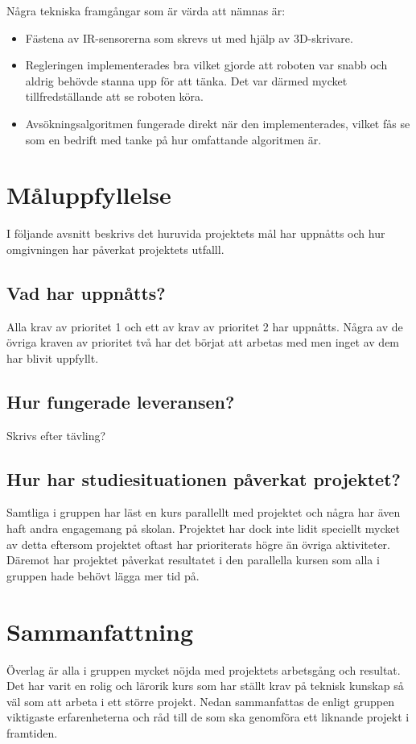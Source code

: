 \documentclass[11pt]{article}
\begin{document}
Några tekniska framgångar som är värda att nämnas är:
\begin{itemize}
\item Fästena av IR-sensorerna som skrevs ut med hjälp av 3D-skrivare.
\item Regleringen implementerades bra vilket gjorde att roboten var snabb och aldrig behövde stanna upp för att tänka. Det var därmed mycket tillfredställande att se roboten köra. 
\item Avsökningsalgoritmen fungerade direkt när den implementerades, vilket fås se som en bedrift med tanke på hur omfattande algoritmen är. 
\end{itemize} 

\pagebreak

\section{Måluppfyllelse}
I följande avsnitt beskrivs det huruvida projektets mål har uppnåtts och hur omgivningen har påverkat projektets utfalll.

\subsection{Vad har uppnåtts?}
Alla krav av prioritet 1 och ett av krav av prioritet 2 har uppnåtts. Några av de övriga kraven av prioritet två har det börjat att arbetas med men inget av dem har blivit uppfyllt.

\subsection{Hur fungerade leveransen?}
Skrivs efter tävling?

\subsection{Hur har studiesituationen påverkat projektet?}
Samtliga i gruppen har läst en kurs parallellt med projektet och några har även haft andra engagemang på skolan. Projektet har dock inte lidit speciellt mycket av detta eftersom projektet oftast har prioriterats högre än övriga aktiviteter. Däremot har projektet påverkat resultatet i den parallella kursen som alla i gruppen hade behövt lägga mer tid på. 

 \pagebreak 

\section{Sammanfattning}
Överlag är alla i gruppen mycket nöjda med projektets arbetsgång och resultat. Det har varit en rolig och lärorik kurs som har ställt krav på teknisk kunskap så väl som att arbeta i ett större projekt. Nedan sammanfattas de enligt gruppen viktigaste erfarenheterna och råd till de som ska genomföra ett liknande projekt i framtiden.
\end{document}
